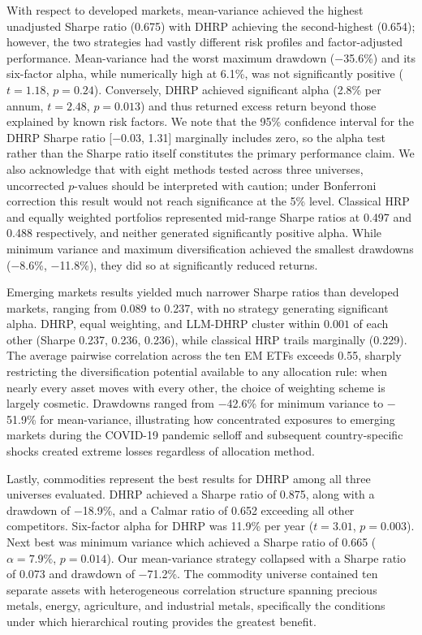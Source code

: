 \documentclass{article}
\begin{document}
With respect to developed markets, mean-variance achieved the highest unadjusted Sharpe ratio (0.675) with DHRP achieving the second-highest (0.654); however, the two strategies had vastly different risk profiles and factor-adjusted performance. Mean-variance had the worst maximum drawdown ($-$35.6\%) and its six-factor alpha, while numerically high at 6.1\%, was not significantly positive ($t=1.18$, $p=0.24$). Conversely, DHRP achieved significant alpha (2.8\% per annum, $t = 2.48$, $p = 0.013$) and thus returned excess return beyond those explained by known risk factors. We note that the 95\% confidence interval for the DHRP Sharpe ratio [$-$0.03, 1.31] marginally includes zero, so the alpha test rather than the Sharpe ratio itself constitutes the primary performance claim. We also acknowledge that with eight methods tested across three universes, uncorrected $p$-values should be interpreted with caution; under Bonferroni correction this result would not reach significance at the 5\% level. Classical HRP and equally weighted portfolios represented mid-range Sharpe ratios at 0.497 and 0.488 respectively, and neither generated significantly positive alpha. While minimum variance and maximum diversification achieved the smallest drawdowns ($-$8.6\%, $-$11.8\%), they did so at significantly reduced returns.

Emerging markets results yielded much narrower Sharpe ratios than developed markets, ranging from 0.089 to 0.237, with no strategy generating significant alpha. DHRP, equal weighting, and LLM-DHRP cluster within $0.001$ of each other (Sharpe 0.237, 0.236, 0.236), while classical HRP trails marginally (0.229). The average pairwise correlation across the ten EM ETFs exceeds 0.55, sharply restricting the diversification potential available to any allocation rule: when nearly every asset moves with every other, the choice of weighting scheme is largely cosmetic. Drawdowns ranged from $-$42.6\% for minimum variance to $-$51.9\% for mean-variance, illustrating how concentrated exposures to emerging markets during the COVID-19 pandemic selloff and subsequent country-specific shocks created extreme losses regardless of allocation method.

Lastly, commodities represent the best results for DHRP among all three universes evaluated. DHRP achieved a Sharpe ratio of 0.875, along with a drawdown of $-$18.9\%, and a Calmar ratio of 0.652 exceeding all other competitors. Six-factor alpha for DHRP was 11.9\% per year ($t=3.01$, $p=0.003$). Next best was minimum variance which achieved a Sharpe ratio of 0.665 ($\alpha = 7.9\%$, $p = 0.014$). Our mean-variance strategy collapsed with a Sharpe ratio of 0.073 and drawdown of $-$71.2\%. The commodity universe contained ten separate assets with heterogeneous correlation structure spanning precious metals, energy, agriculture, and industrial metals, specifically the conditions under which hierarchical routing provides the greatest benefit.
\end{document}
